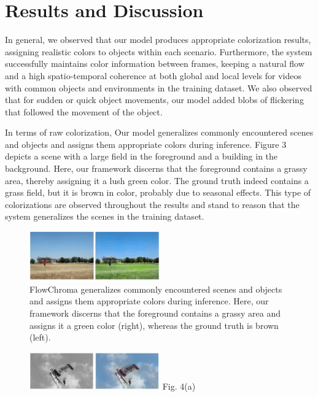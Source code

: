 \documentclass[10pt,twocolumn,letterpaper]{article}
\begin{document}
\section{Results and Discussion}
In general, we observed that our model produces appropriate colorization results, assigning realistic colors to objects within each scenario. Furthermore, the system successfully maintains color information between frames, keeping a natural flow and a high spatio-temporal coherence at both global and local levels for videos with common objects and environments in the training dataset. We also observed that for sudden or quick object movements, our model added blobs of flickering that followed the movement of the object.

In terms of raw colorization, Our model generalizes commonly encountered scenes and objects and assigns them appropriate colors during inference. Figure 3 depicts a scene with a large field in the foreground and a building in the background. Here, our framework discerns that the foreground contains a grassy area, thereby assigning it a lush green color. The ground truth indeed contains a grass field, but it is brown in color, probably due to seasonal effects. This type of colorizations are observed throughout the results and stand to reason that the system generalizes the scenes in the training dataset.

\begin{figure}[!h]
  \centering
  \includegraphics[width=0.5\textwidth]{original-fc-grass-building.jpg}
  \caption{FlowChroma generalizes commonly encountered scenes and objects and assigns them appropriate colors during inference. Here, our framework discerns that the foreground contains a grassy area and assigns it a green color (right), whereas the ground truth is brown (left).}
\end{figure}

\begin{figure}[!h]
  \centering
  \includegraphics[width=0.5\textwidth]{bw-fc-parachute.jpg}
  \label{}{\footnotesize Fig. 4(a)}
\end{figure}
\end{document}
